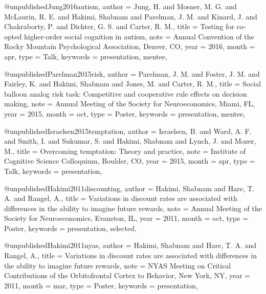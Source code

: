 @unpublished{Jung2016autism,
  author   = {Jung, H. and Mosner, M. G. and McLaurin, R. E.
              and Hakimi, Shabnam and Parelman, J. M. and Kinard, J.
              and Chakraborty, P. and Dichter, G. S. and Carter, R. M.},
  title    = {Testing for co-opted higher-order social cognition in autism},
  note     = {Annual Convention of the Rocky Mountain Psychological
              Association, Denver, CO},
  year     = {2016},
  month    = apr,
  type     = {Talk},
  keywords = {presentation, mentee},
}


@unpublished{Parelman2015risk,
  author   = {Parelman, J. M. and Foster, J. M. and Fairley, K.
              and Hakimi, Shabnam and Jones, M. and Carter, R. M.},
  title    = {Social balloon analog risk task: Competitive and cooperative
              rule effects on decision making},
  note     = {Annual Meeting of the Society for Neuroeconomics, Miami, FL},
  year     = {2015},
  month    = oct,
  type     = {Poster},
  keywords = {presentation, mentee},
}

@unpublished{Israelsen2015temptation,
  author   = {Israelsen, B. and Ward, A. F. and Smith, I. and Sukumar, S.
              and Hakimi, Shabnam and Lynch, J. and Mozer, M.},
  title    = {Overcoming temptation: Theory and practice},
  note     = {Institute of Cognitive Science Colloquium, Boulder, CO},
  year     = {2015},
  month    = apr,
  type     = {Talk},
  keywords = {presentation},
}


@unpublished{Hakimi2011discounting,
  author   = {Hakimi, Shabnam and Hare, T. A. and Rangel, A.},
  title    = {Variations in discount rates are associated with differences
              in the ability to imagine future rewards},
  note     = {Annual Meeting of the Society for Neuroeconomics,
              Evanston, IL},
  year     = {2011},
  month    = oct,
  type     = {Poster},
  keywords = {presentation, selected},
}

@unpublished{Hakimi2011nyas,
  author   = {Hakimi, Shabnam and Hare, T. A. and Rangel, A.},
  title    = {Variations in discount rates are associated with differences
              in the ability to imagine future rewards},
  note     = {NYAS Meeting on Critical Contributions of the Orbitofrontal
              Cortex to Behavior, New York, NY},
  year     = {2011},
  month    = mar,
  type     = {Poster},
  keywords = {presentation},
}

